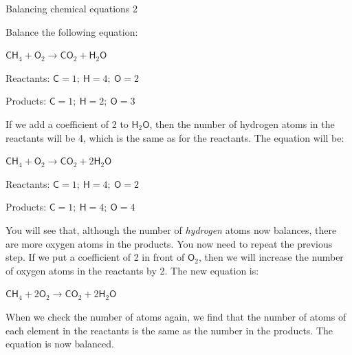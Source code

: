 \begin{wex}{Balancing chemical equations 2}{Balance the following equation:
\begin{center}
${\mathsf{CH}_{4} + \mathsf{O}_{2} \rightarrow \mathsf{CO}_{2} + \mathsf{H}_{2}\mathsf{O}}$
\end{center}
}

{

Reactants: $\mathsf{C} = 1;~ \mathsf{H} = 4;~ \mathsf{O} = 2$

Products: $\mathsf{C} = 1;~ \mathsf{H} = 2;~ \mathsf{O} = 3$
}

{

If we add a coefficient of 2 to $\mathsf{H}_{2}\mathsf{O}$, then the number of hydrogen atoms in the reactants will be 4, which is the same as for the reactants. The equation will be:

\begin{center}
${\mathsf{CH}_{4} + \mathsf{O}_{2} \rightarrow \mathsf{CO}_{2} + 2\mathsf{H}_{2}\mathsf{O}}$\\
\end{center}
}

{

Reactants: $\mathsf{C} = 1;~ \mathsf{H} = 4;~ \mathsf{O} = 2$

Products: $\mathsf{C} = 1;~ \mathsf{H} = 4; ~\mathsf{O} = 4$

You will see that, although the number of \textit{hydrogen} atoms now balances, there are more oxygen atoms in the products. You now need to repeat the previous step. If we put a coefficient of 2 in front of $\mathsf{O}_{2}$, then we will increase the number of oxygen atoms in the reactants by 2. The new equation is:

\begin{center}
${\mathsf{CH}_{4} + 2\mathsf{O}_{2} \rightarrow \mathsf{CO}_{2} + 2\mathsf{H}_{2}\mathsf{O}}$
\end{center}

When we check the number of atoms again, we find that the number of atoms of each element in the reactants is the same as the number in the products. The equation is now balanced.
}
\end{wex}
    \noindent
\label{m38726*secfhsst!!!underscore!!!id501}\vspace{.5cm} 
      \noindent
\par
            \label{m38726*secfhsst!!!underscore!!!id590}\vspace{.5cm} 
